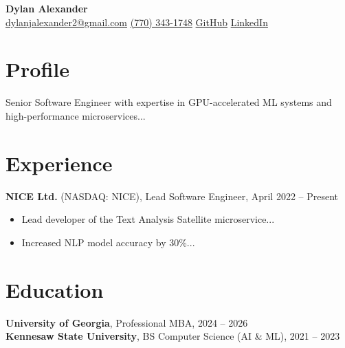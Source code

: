 \documentclass[10pt, letterpaper]{article}
\begin{document}
\begin{center}
    {\Huge \textbf{Dylan Alexander}} \\[6pt]
    \href{mailto:dylanjalexander2@gmail.com}{dylanjalexander2@gmail.com} \quad
    \href{tel:7703431748}{(770) 343-1748} \quad
    \href{https://github.com/wisenickel5}{GitHub} \quad
    \href{https://linkedin.com/in/yourusername}{LinkedIn}
\end{center}

\vspace{0.3 cm}

\section*{Profile}
Senior Software Engineer with expertise in GPU-accelerated ML systems and high-performance microservices...

\vspace{0.3 cm}
\section*{Experience}
\textbf{NICE Ltd.} (NASDAQ: NICE), Lead Software Engineer, April 2022 – Present
\begin{itemize}[leftmargin=0.5cm]
    \item Lead developer of the Text Analysis Satellite microservice...
    \item Increased NLP model accuracy by 30\%...
\end{itemize}

\vspace{0.3 cm}
\section*{Education}
\textbf{University of Georgia}, Professional MBA, 2024 – 2026 \\
\textbf{Kennesaw State University}, BS Computer Science (AI \& ML), 2021 – 2023
\end{document}

